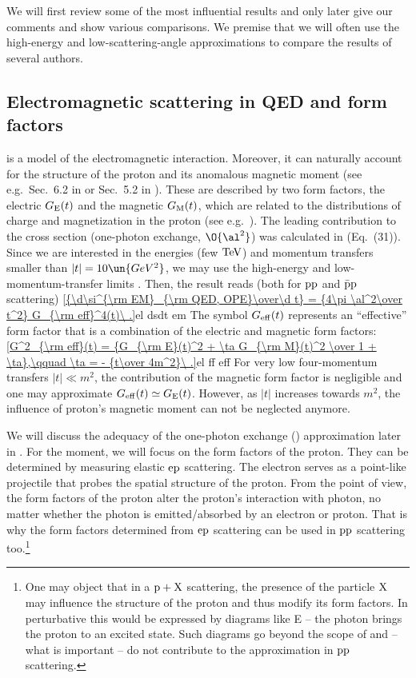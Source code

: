 We will first review some of the most influential results and only later give our comments and show various comparisons. We premise that we will often use the high-energy and low-scattering-angle approximations to compare the results of several authors.


\subsection[em sc qed]{Electromagnetic scattering in QED and form factors}

 is a  model of the electromagnetic interaction. Moreover, it can naturally account for the structure of the proton and its anomalous magnetic moment (see e.g.~Sec.~6.2 in  or Sec.~5.2 in ). These are described by two form factors, the electric $G_{\rm E}(t)$ and the magnetic $G_{\rm M}(t)$, which are related to the distributions of charge and magnetization in the proton (see e.g.~). The leading contribution to the cross section (one-photon exchange, $\O{\al^2}$) was calculated in  (Eq.~(31)). Since we are interested in the  energies (few $\rm TeV$) and momentum transfers smaller than $|t| = 10\un{GeV^2}$, we may use the high-energy and low-momentum-transfer limits . Then, the result reads (both for $\rm pp$ and $\rm \bar p p$ scattering)
\eqref{{\d\si^{\rm EM}_{\rm QED, OPE}\over\d t} = {4\pi \al^2\over t^2} G_{\rm eff}^4(t)\ .}{el dsdt em}
The symbol $G_{\rm eff}(t)$ represents an ``effective'' form factor that is a combination of the electric and magnetic form factors:
\eqref{G^2_{\rm eff}(t) = {G_{\rm E}(t)^2 + \ta G_{\rm M}(t)^2 \over 1 + \ta},\qquad \ta = - {t\over 4m^2}\ .}{el ff eff}
For very low four-momentum transfers $|t| \ll m^2$, the contribution of the magnetic form factor is negligible and one may approximate $G_{\rm eff}(t) \simeq G_{\rm E}(t)$. However, as $|t|$ increases towards $m^2$, the influence of proton's magnetic moment can not be neglected anymore.

We will discuss the adequacy of the one-photon exchange () approximation later in . For the moment, we will focus on the form factors of the proton. They can be determined by measuring elastic $\rm ep$ scattering. The electron serves as a point-like projectile that probes the spatial structure of the proton. From the  point of view, the form factors of the proton alter the proton's interaction with photon, no matter whether the photon is emitted/absorbed by an electron or proton. That is why the form factors determined from $\rm ep$ scattering can be used in $\rm pp$ scattering too.\footnote{%
One may object that in a $\rm p+X$ scattering, the presence of the particle $\rm X$ may influence the structure of the proton and thus modify its form factors. In perturbative  this would be expressed by diagrams like  E -- the photon brings the proton to an excited state. Such diagrams go beyond the scope of  and -- what is important -- do not contribute to the  approximation in $\rm pp$ scattering.
}

